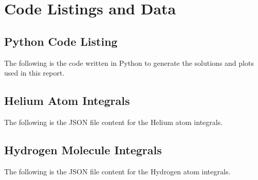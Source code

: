 \documentclass[10pt, oneside, letterpaper]{article}
\begin{document}
\newpage
\section{Code Listings and Data}

\subsection{Python Code Listing}
\label{code-listing-python}
The following is the code written in Python to generate the solutions and plots used in this report.


\subsection{Helium Atom Integrals}
\label{he-integrals}
The following is the JSON file content for the Helium atom integrals.


\subsection{Hydrogen Molecule Integrals}
\label{h2-integrals}
The following is the JSON file content for the Hydrogen atom integrals.


\nocite{*}

\newpage


\end{document}
